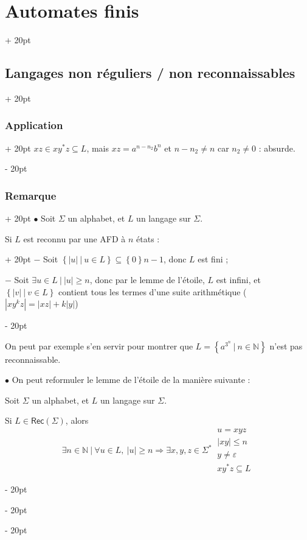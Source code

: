\documentclass[a4paper, 12pt, twoside]{article}
\newcommand{\N}{\mathbb{N}} %
\newcommand{\lr}[1]{\left( #1 \right)}
\newcommand{\set}[1]{\left\{ #1 \right\}}
\newcommand{\abs}[1]{\left\lvert #1 \right\rvert}
\renewcommand{\le}{\leqslant}
\renewcommand{\ge}{\geqslant}
\newcommand{\ind}[1][20pt]{\advance\leftskip + #1}
\newcommand{\deind}[1][20pt]{\advance\leftskip - #1}
\newenvironment{indt}[2][20pt]{#2 \par \ind[#1]}{\par \deind} %
\newcommand{\Rec}[1]{\mathsf{Rec}\!\lr{#1}}
\begin{document}
\begin{indt}{\section{Automates finis}}
\begin{indt}{\subsection{Langages non réguliers / non reconnaissables}}
\begin{indt}{\subsubsection{Application}}
                $xz \in xy^* z \subseteq L$, mais $xz = a^{n - n_2}b^n$ et $n - n_2 \neq n$ car $n_2 \neq 0$ : absurde.
            \end{indt}

            \vspace{12pt}
            
            \begin{indt}{\subsubsection{Remarque}}
                $\bullet$ Soit $\Sigma$ un alphabet, et $L$ un langage sur $\Sigma$.

                \begin{indt}{Si $L$ est reconnu par une AFD à $n$ états :}
                    $-$ Soit $\set{\abs u \ |\ u \in L} \subseteq \set 0 {n - 1}$, donc $L$ est fini ;

                    $-$ Soit $\exists u \in L\ |\ \abs u \ge n$, donc par le lemme de l'étoile, $L$ est infini, et $\set{\abs v\ |\ v \in L}$ contient tous les termes d'une suite arithmétique ($\abs{xy^kz} = \abs {xz} + k \abs y$)
                \end{indt}

                On peut par exemple s'en servir pour montrer que $L = \set{a^{3^n}\ |\ n \in \N}$ n'est pas reconnaissable.

                \vspace{6pt}
                
                $\bullet$ On peut reformuler le lemme de l'étoile de la manière suivante :

                \begin{emphBox}
                    Soit $\Sigma$ un alphabet, et $L$ un langage sur $\Sigma$.
                    
                    Si $L \in \Rec \Sigma$, alors
                    \[
                        \exists n \in \N\ |\
                        \forall u \in L,\
                        \abs u \ge n \Rightarrow \exists x, y, z \in \Sigma^*\
                        \begin{array}{|l}
                            u = xyz
                            \\
                            \abs{xy} \le n
                            \\
                            y \neq \varepsilon
                            \\
                            xy^*z \subseteq L
                        \end{array}
                    \]
                \end{emphBox}


\end{indt}
\end{indt}
\end{indt}
\end{document}
